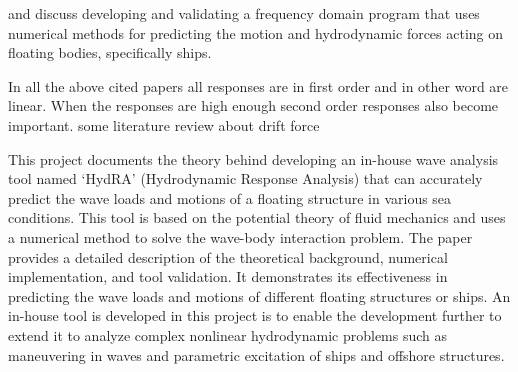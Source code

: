 \cite{guha2013development} and \cite{guha2015estimation} discuss developing and validating a frequency domain program that uses numerical methods for predicting the motion and hydrodynamic forces acting on floating bodies, specifically ships.

In all the above cited papers all responses are in first order and in other word are linear. When the responses are high enough
second order responses also become important.
some literature review about drift force

This project documents the theory behind developing an in-house wave analysis tool named `HydRA' (Hydrodynamic Response Analysis) that can accurately predict the wave loads and motions of a floating structure in various sea conditions. This tool is based on the potential theory of fluid mechanics and uses a numerical method to solve the wave-body interaction problem. The paper provides a detailed description of the theoretical background, numerical implementation, and tool validation. It demonstrates its effectiveness in predicting the wave loads and motions of different floating structures or ships. An in-house tool is developed in this project is to enable the development further to extend it to analyze complex nonlinear hydrodynamic problems such as maneuvering in waves and parametric excitation of ships and offshore structures. 
